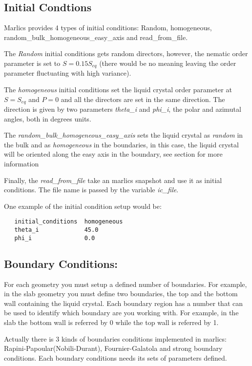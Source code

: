 \documentclass{article}
\begin{document}
\subsection{Initial Condtions}\label{ic.params}

Marlics provides 4 types of initial conditions: Random, homogeneous, random_bulk_homogeneous_easy_axis and read_from_file.

The \textit{Random} initial conditions gets random directors, however, the nematic order parameter is set to $S=0.15 S_{eq}$ (there would be no meaning leaving the order parameter fluctuating with high variance).

The \textit{homogeneous} initial conditions set the liquid crystal order parameter at $S=S_{eq}$ and $P=0$ and all the directors are set in the same direction. The direction is given by two parameters \textit{theta_i} and \textit{phi_i}, the polar and azimutal angles, both in degrees units.

The \textit{random_bulk_homogeneous_easy_axis} sets the liquid crystal as \textit{random} in the bulk and as \textit{homogeneous} in the boundaries, in this case, the liquid crystal will be oriented along the easy axis in the boundary, see section \label{ssec:boundary} for more information

Finally, the \textit{read_from_file} take an marlics snapshot and use it as initial conditions. The file name is passed by the variable \textit{ic_file}. 

One example of the initial condition setup would be:
\begin{lstlisting}
   initial_conditions  homogeneous
   theta_i             45.0
   phi_i               0.0	
\end{lstlisting}


\subsection{Boundary Conditions:}\label{boundary.params}

For each geometry you must setup a defined number of boundaries. For example, in the slab geometry you must define two boundaries, the top and the bottom wall containing the liquid crystal. Each boundary region has a number that can be used to identify which boundary are you working with. For example, in the slab the bottom wall is referred by 0 while the top wall is referred by 1.

Actually there is 3 kinds of boundaries conditions implemented in marlics: Rapini-Papoular(Nobili-Durant), Fournier-Galatola and strong boundary conditions. Each boundary conditions needs its sets  of parameters defined.
\end{document}
